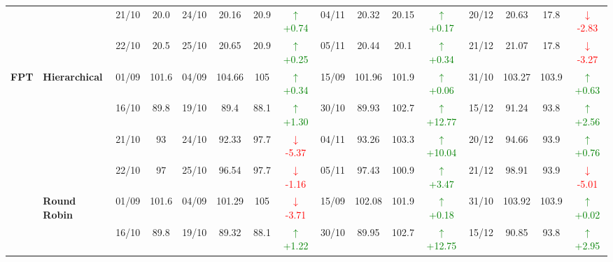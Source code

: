 \documentclass{ieeeaccess}
\begin{document}
{\begin{longtable}{llcc|cccc|cccc|cccc}
&
& 21/10 & 20.0 & 24/10 & 20.16 & 20.9 & \textcolor{green}{\(\uparrow\)+0.74} & 04/11 & 20.32 & 20.15 & \textcolor{green}{\(\uparrow\)+0.17} & 20/12 & 20.63 & 17.8 & \textcolor{red}{\(\downarrow\)-2.83} \\

&
& 22/10 & 20.5 & 25/10 & 20.65 & 20.9 & \textcolor{green}{\(\uparrow\)+0.25} & 05/11 & 20.44 & 20.1 & \textcolor{green}{\(\uparrow\)+0.34} & 21/12 & 21.07 & 17.8 & \textcolor{red}{\(\downarrow\)-3.27} \\
\midrule



\multirow{12}{*}{\textbf{FPT}} 
& \textbf{Hierarchical}
& 01/09 & 101.6 & 04/09 & 104.66 & 105 & \textcolor{green}{\(\uparrow\)+0.34} & 15/09 & 101.96 & 101.9 & \textcolor{green}{\(\uparrow\)+0.06} & 31/10 & 103.27 & 103.9 & \textcolor{green}{\(\uparrow\)+0.63} \\

&
& 16/10 & 89.8 & 19/10 & 89.4 & 88.1 & \textcolor{green}{\(\uparrow\)+1.30} & 30/10 & 89.93 & 102.7 & \textcolor{green}{\(\uparrow\)+12.77} & 15/12 & 91.24 & 93.8 & \textcolor{green}{\(\uparrow\)+2.56} \\

&
& 21/10 & 93 & 24/10 & 92.33 & 97.7 & \textcolor{red}{\(\downarrow\)-5.37} & 04/11 & 93.26 & 103.3 & \textcolor{green}{\(\uparrow\)+10.04} & 20/12 & 94.66 & 93.9 & \textcolor{green}{\(\uparrow\)+0.76} \\

&
& 22/10 & 97 & 25/10 & 96.54 & 97.7 & \textcolor{red}{\(\downarrow\)-1.16} & 05/11 & 97.43 & 100.9 & \textcolor{green}{\(\uparrow\)+3.47} & 21/12 & 98.91 & 93.9 & \textcolor{red}{\(\downarrow\)-5.01} \\
\cmidrule(lr){2-16}


& \textbf{Round Robin}
& 01/09 & 101.6 & 04/09 & 101.29 & 105 & \textcolor{red}{\(\downarrow\)-3.71} & 15/09 & 102.08 & 101.9 & \textcolor{green}{\(\uparrow\)+0.18} & 31/10 & 103.92 & 103.9 & \textcolor{green}{\(\uparrow\)+0.02} \\

&
& 16/10 & 89.8 & 19/10 & 89.32 & 88.1 & \textcolor{green}{\(\uparrow\)+1.22} & 30/10 & 89.95 & 102.7 & \textcolor{green}{\(\uparrow\)+12.75} & 15/12 & 90.85 & 93.8 & \textcolor{green}{\(\uparrow\)+2.95} \\


\end{longtable}}
\end{document}
